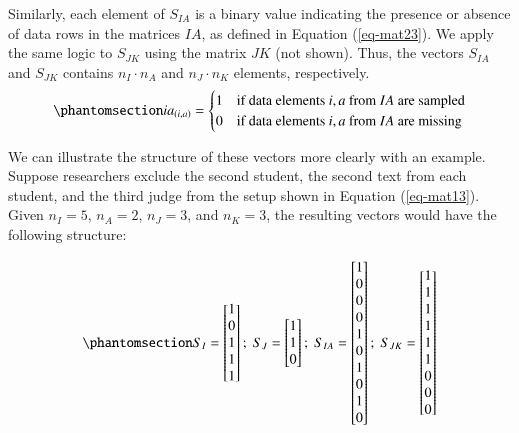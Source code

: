 \documentclass[
  authoryear,
  review,
  1p]{elsarticle}
\begin{document}
Similarly, each element of \(S_{IA}\) is a binary value indicating the
presence or absence of data rows in the matrices \(IA\), as defined in
Equation (\ref{eq-mat23}). We apply the same logic to \(S_{JK}\) using
the matrix \(JK\) (not shown). Thus, the vectors \(S_{IA}\) and
\(S_{JK}\) contains \(n_{I} \cdot n_{A}\) and \(n_{J} \cdot n_{K}\)
elements, respectively. \begin{equation}\phantomsection\label{eq-mat23}{
ia_{(i,a)} = \begin{cases} 
1 & \text{if data elements } i,a \text{ from } IA \text{ are sampled} \\
0 & \text{if data elements } i,a \text{ from } IA \text{ are missing}
\end{cases}
}\end{equation}

We can illustrate the structure of these vectors more clearly with an
example. Suppose researchers exclude the second student, the second text
from each student, and the third judge from the setup shown in Equation
(\ref{eq-mat13}). Given \(n_{I} = 5\), \(n_{A} = 2\), \(n_{J} = 3\), and
\(n_{K} = 3\), the resulting vectors would have the following structure:

\begin{equation}\phantomsection\label{eq-mat24}{
S_{I} = \begin{bmatrix}
1 \\
0 \\
1 \\
1 \\
1
\end{bmatrix} ; \;
S_{J} = \begin{bmatrix}
1 \\
1 \\
0
\end{bmatrix} ; \;
S_{IA} = \begin{bmatrix}
1 \\
0 \\
0 \\
0 \\
1 \\
0 \\
1 \\
0 \\
1 \\
0 
\end{bmatrix} ; \;
S_{JK} = \begin{bmatrix}
1 \\
1 \\
1 \\
1 \\
1 \\
1 \\
0 \\
0 \\
0 
\end{bmatrix}
}\end{equation}
\end{document}
